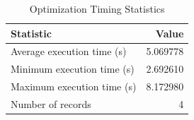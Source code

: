 
\begin{table}[h!]
\centering
\begin{tabular}{l r}
\hline
Statistic & Value \\
\hline
Average execution time (s) & 5.069778 \\
Minimum execution time (s) & 2.692610 \\
Maximum execution time (s) & 8.172980 \\
Number of records & 4 \\
\hline
\end{tabular}
\caption{Optimization Timing Statistics}
\end{table}
